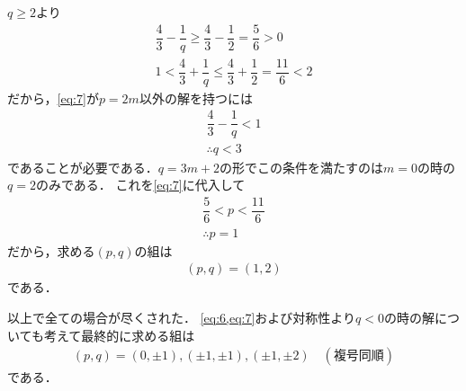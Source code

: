 \documentclass[../../main.tex]{subfiles}
\begin{document}
$q \ge 2$より
\begin{align}
  \dfrac{4}{3} - \dfrac{1}{q} \ge \dfrac{4}{3} - \dfrac{1}{2} = \dfrac{5}{6}  > 0\\
  1< \dfrac{4}{3} + \dfrac{1}{q} \le \dfrac{4}{3} + \dfrac{1}{2} = \dfrac{11}{6} < 2
\end{align}
だから，\cref{eq:7}が$p=2m$以外の解を持つには
\begin{align}
  \dfrac{4}{3} - \dfrac{1}{q} < 1 \\
  \therefore
  q < 3
\end{align}
であることが必要である．$q=3m+2$の形でこの条件を満たすのは$m=0$の時の$q=2$のみである．
これを\cref{eq:7}に代入して
\begin{align}
  \dfrac{5}{6} < p < \dfrac{11}{6} \\
  \therefore
  p = 1
\end{align}
だから，求める$(p,q)$の組は
\begin{align}
  (p,q) = (1,2) \label{eq:8}
\end{align}
である．
\casesend

以上で全ての場合が尽くされた．
\cref{eq:6,eq:7}および対称性より$q<0$の時の解についても考えて最終的に求める組は
\begin{align}
  (p,q) = (0, \pm 1), (\pm 1, \pm 1), (\pm 1, \pm 2) \quad (\text{複号同順})
\end{align}
である．

\newpage
\end{document}
